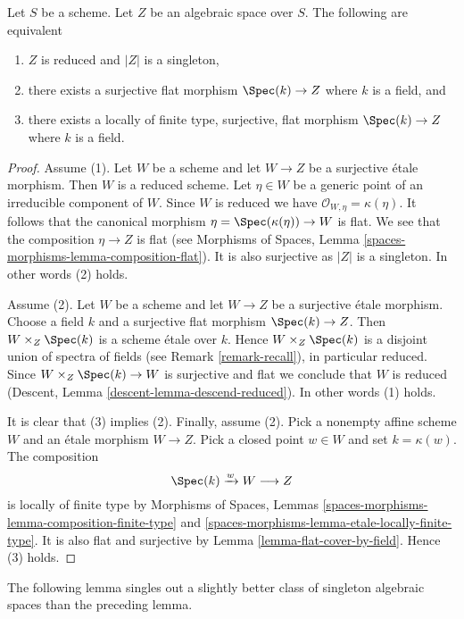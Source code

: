 \begin{lemma}
\label{lemma-unique-point}
Let $S$ be a scheme.
Let $Z$ be an algebraic space over $S$. The following are equivalent
\begin{enumerate}
\item $Z$ is reduced and $|Z|$ is a singleton,
\item there exists a surjective flat morphism $\Spec(k) \to Z$
where $k$ is a field, and
\item there exists a locally of finite type, surjective, flat morphism
$\Spec(k) \to Z$ where $k$ is a field.
\end{enumerate}
\end{lemma}

\begin{proof}
Assume (1). Let $W$ be a scheme and
let $W \to Z$ be a surjective \'etale morphism. Then $W$ is
a reduced scheme. Let $\eta \in W$ be a generic point of an irreducible
component of $W$. Since $W$ is reduced we have
$\mathcal{O}_{W, \eta} = \kappa(\eta)$. It follows that the canonical
morphism $\eta = \Spec(\kappa(\eta)) \to W$ is flat. We see that the
composition $\eta \to Z$ is flat (see
Morphisms of Spaces, Lemma \ref{spaces-morphisms-lemma-composition-flat}).
It is also surjective as $|Z|$ is a singleton. In other words
(2) holds.

\medskip\noindent
Assume (2). Let $W$ be a scheme and
let $W \to Z$ be a surjective \'etale morphism. Choose a field
$k$ and a surjective flat morphism $\Spec(k) \to Z$.
Then $W \times_Z \Spec(k)$ is a scheme \'etale over $k$.
Hence $W \times_Z \Spec(k)$ is a disjoint union of spectra of fields
(see Remark \ref{remark-recall}), in particular reduced. Since
$W \times_Z \Spec(k) \to W$
is surjective and flat we conclude that $W$ is reduced
(Descent, Lemma \ref{descent-lemma-descend-reduced}).
In other words (1) holds.

\medskip\noindent
It is clear that (3) implies (2). Finally, assume (2). Pick a nonempty
affine scheme $W$ and an \'etale morphism $W \to Z$. Pick a closed
point $w \in W$ and set $k = \kappa(w)$. The composition
$$
\Spec(k) \xrightarrow{w} W \longrightarrow Z
$$
is locally of finite type by
Morphisms of Spaces, Lemmas
\ref{spaces-morphisms-lemma-composition-finite-type} and
\ref{spaces-morphisms-lemma-etale-locally-finite-type}.
It is also flat and surjective by
Lemma \ref{lemma-flat-cover-by-field}.
Hence (3) holds.
\end{proof}

\noindent
The following lemma singles out a slightly better class of singleton
algebraic spaces than the preceding lemma.

